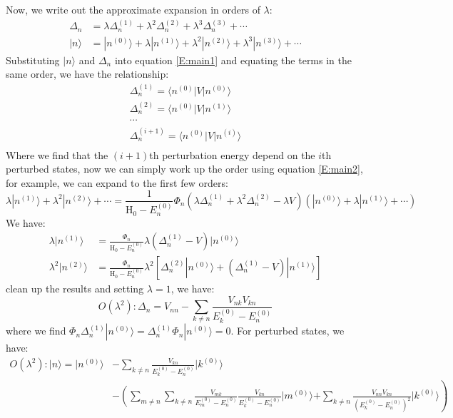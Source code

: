 \documentclass{article}
\newcommand{\huptb}{\text{H}_0}
\newcommand{\order}[2]{#1^{(#2)}}
\newcommand{\statebra}[1]{\langle #1 |}
\newcommand{\stateket}[1]{| #1 \rangle}
\begin{document}
Now, we write out the approximate expansion in orders of $\lambda$:
\begin{align}
    \Delta_n &= \lambda \order{\Delta_n}{1} + \lambda^2 \order{\Delta_n}{2} + \lambda^3 \order{\Delta_n}{3} + \cdots \\
    \stateket{n} &= \stateket{\order{n}{0}} + \lambda \stateket{\order{n}{1}} + 
                    \lambda^2 \stateket{\order{n}{2}} + \lambda^3 \stateket{\order{n}{3}} + \cdots
\end{align}
Substituting $\stateket{n}$ and $\Delta_n$ into equation \eqref{E:main1} and equating the terms in the same order,
we have the relationship:
\begin{gather}
    \order{\Delta_n}{1} = \statebra{\order{n}{0}} V \stateket{\order{n}{0}} \\
    \order{\Delta_n}{2} = \statebra{\order{n}{0}} V \stateket{\order{n}{1}} \\
    \cdots \\
    \order{\Delta_n}{i+1} = \statebra{\order{n}{0}} V \stateket{\order{n}{i}} \\
\end{gather}
Where we find that the $(i+1)$th perturbation energy depend on the $i$th perturbed states, 
now we can simply work up the order using equation \eqref{E:main2}, for example, we can expand to 
the first few orders:
\begin{equation}
    \lambda \stateket{\order{n}{1}} + \lambda^2 \stateket{\order{n}{2}} + \cdots 
    = \frac{1}{\huptb - \order{E_n}{0}} \Phi_n (\lambda \order{\Delta_n}{1} + \lambda^2 \order{\Delta_n}{2} - \lambda V) 
    \left( 
        \stateket{\order{n}{0}} + \lambda \stateket{\order{n}{1}} + \cdots
    \right)
\end{equation}
We have:
\begin{align}
    \lambda \stateket{\order{n}{1}} &= \frac{\Phi_n}{\huptb - \order{E_n}{0}} \lambda (\order{\Delta_n}{1} - V) \stateket{\order{n}{0}} \\ 
    \lambda^2 \stateket{\order{n}{2}} &= 
    \frac{\Phi_n}{\huptb - \order{E_n}{0}} \lambda^2 
        \left[ \order{\Delta_n}{2} \stateket{\order{n}{0}} +  (\order{\Delta_n}{1} - V) \stateket{\order{n}{1}}  \right]
\end{align}
clean up the results and setting $\lambda = 1$, we have:
\begin{equation}
    O(\lambda^2): \Delta_n = V_{nn} - \sum_{k\neq n}\frac{V_{nk}V_{kn}}{\order{E_k}{0} - \order{E_n}{0}}
\end{equation}
where we find $\Phi_n \order{\Delta_n}{1} \stateket{\order{n}{0}} = \order{\Delta_n}{1} \Phi_n \stateket{\order{n}{0}} = 0$. 
For perturbed states, we have:
\begin{align}
    O(\lambda^2): \stateket{n} = \stateket{\order{n}{0}} &- \sum_{k\neq n} \frac{V_{kn}}{\order{E_k}{0} - \order{E_n}{0}} \stateket{\order{k}{0}} \\ 
    & - \left( \sum_{m\neq n}\sum_{k\neq n} \frac{V_{mk}}{\order{E_m}{0} - \order{E_n}{0}} \frac{V_{kn}}{\order{E_k}{0} - \order{E_n}{0}} \stateket{\order{m}{0}} \right.
    \left. + \sum_{k\neq n} \frac{V_{nn}V_{kn}}{(\order{E_k}{0} - \order{E_n}{0})^2} \stateket{\order{k}{0}} \right)
\end{align}
\end{document}
